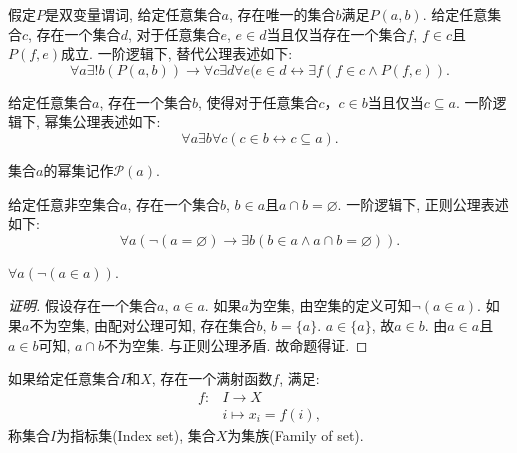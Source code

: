 \begin{axiom}[替代公理]
	假定$P$是双变量谓词, 给定任意集合$a$, 存在唯一的集合$b$满足$P(a,b)$. 给定任意集合$c$, 存在一个集合$d$, 对于任意集合$e$, $e\in d$当且仅当存在一个集合$f$, $f\in c$且$P(f,e)$成立. 一阶逻辑下, 替代公理表述如下:
	\begin{equation}
		\forall a\exists!b(P(a,b))\rightarrow \forall c\exists d\forall e(e\in d\leftrightarrow \exists f(f\in c\wedge P(f, e)).
	\end{equation}
\end{axiom}

\begin{axiom}[幂集公理]
	给定任意集合$a$, 存在一个集合$b$, 使得对于任意集合$c$，$c\in b$当且仅当$c\subseteq a$. 一阶逻辑下, 幂集公理表述如下:
	\begin{equation}
		\forall a\exists b\forall c(c\in b\leftrightarrow c\subseteq a).
	\end{equation}
\end{axiom}

集合$a$的幂集记作$\mathcal P(a)$.

\begin{axiom}[正则公理]
	给定任意非空集合$a$, 存在一个集合$b$, $b\in a$且$a\cap b=\varnothing$. 一阶逻辑下, 正则公理表述如下:
	\begin{equation}
		\forall a(\neg(a=\varnothing)\rightarrow \exists b(b\in a\wedge a\cap b=\varnothing)).
	\end{equation}
\end{axiom}

\begin{proposition}
	$\forall a(\neg (a\in a))$.
\end{proposition}

\begin{proof}[证明]
	假设存在一个集合$a$, $a\in a$. 如果$a$为空集, 由空集的定义可知$\neg(a\in a)$. 如果$a$不为空集, 由配对公理可知, 存在集合$b$, $b=\{a\}$. $a\in \{a\}$, 故$a\in b$. 由$a\in a$且$a\in b$可知, $a\cap b$不为空集. 与正则公理矛盾. 故命题得证.
\end{proof}

\begin{definition}[集族]
	如果给定任意集合$I$和$X$, 存在一个满射函数$f$, 满足:
	\begin{align*}
	f\colon & I\rightarrow X \\
	& i\mapsto x_i=f(i),
	\end{align*}
	称集合$I$为指标集(Index set), 集合$X$为集族(Family of set).
\end{definition}


